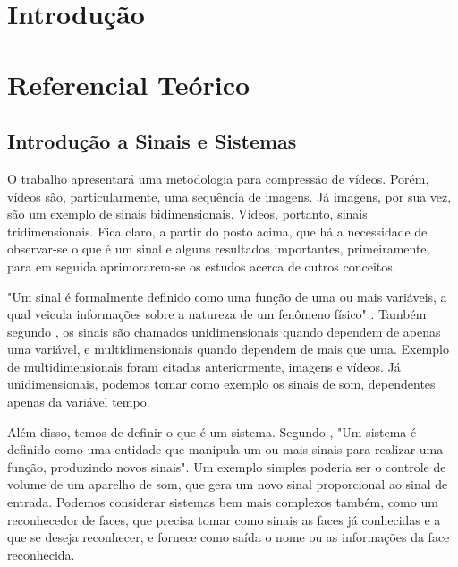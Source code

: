 \documentclass[cic,tc]{iiufrgs}
\begin{document}

\tableofcontents


\chapter{Introdução}

\chapter{Referencial Teórico}

\section{Introdução a Sinais e Sistemas}
O trabalho apresentará uma metodologia para compressão de vídeos.
Porém, vídeos são, particularmente, uma sequência de imagens.
Já imagens, por sua vez, são um exemplo de sinais bidimensionais.
Vídeos, portanto, sinais tridimensionais.
Fica claro, a partir do posto acima, que há a necessidade de observar-se 
o que é um sinal e alguns resultados importantes, primeiramente, para 
em seguida aprimorarem-se os estudos acerca de outros conceitos.

"Um sinal é formalmente definido como uma função de uma ou mais variáveis, 
a qual veicula informações sobre a natureza de um fenômeno físico" \cite{haykin2001sinais}.
Também segundo \citet{haykin2001sinais}, os sinais são chamados unidimensionais quando
dependem de apenas uma variável, e multidimensionais quando dependem de mais que uma.
Exemplo de multidimensionais foram citadas anteriormente, imagens e vídeos. 
Já unidimensionais, podemos tomar como exemplo os sinais de som, dependentes apenas da variável tempo.

Além disso, temos de definir o que é um sistema. 
Segundo \citet{haykin2001sinais}, "Um sistema é definido como uma entidade que manipula
um ou mais sinais para realizar uma função, produzindo novos sinais".
Um exemplo simples poderia ser o controle de volume de um aparelho de som,
que gera um novo sinal proporcional ao sinal de entrada.
Podemos considerar sistemas bem mais complexos também, como um reconhecedor 
de faces, que precisa tomar como sinais as faces já conhecidas e a que se 
deseja reconhecer, e fornece como saída o nome ou as informações da face reconhecida.
\end{document}
